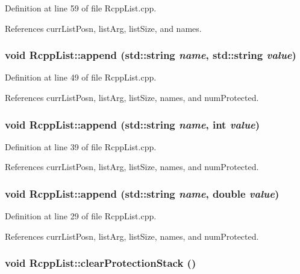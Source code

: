 Definition at line 59 of file RcppList.cpp.

References currListPosn, listArg, listSize, and names.\hypertarget{classRcppList_a896d405a8a82cd6b5b9eaf2976bc54d6}{
\subsubsection[{append}]{\setlength{\rightskip}{0pt plus 5cm}void RcppList::append (std::string {\em name}, \/  std::string {\em value})}}
\label{classRcppList_a896d405a8a82cd6b5b9eaf2976bc54d6}


Definition at line 49 of file RcppList.cpp.

References currListPosn, listArg, listSize, names, and numProtected.\hypertarget{classRcppList_a129144193234d87bcba6aed3acf53254}{
\subsubsection[{append}]{\setlength{\rightskip}{0pt plus 5cm}void RcppList::append (std::string {\em name}, \/  int {\em value})}}
\label{classRcppList_a129144193234d87bcba6aed3acf53254}


Definition at line 39 of file RcppList.cpp.

References currListPosn, listArg, listSize, names, and numProtected.\hypertarget{classRcppList_a259b0c48d68d995bcd906b8c1e8c970a}{
\subsubsection[{append}]{\setlength{\rightskip}{0pt plus 5cm}void RcppList::append (std::string {\em name}, \/  double {\em value})}}
\label{classRcppList_a259b0c48d68d995bcd906b8c1e8c970a}


Definition at line 29 of file RcppList.cpp.

References currListPosn, listArg, listSize, names, and numProtected.\hypertarget{classRcppList_a164577340e23dd0811fc7057aa9aedec}{
\subsubsection[{clearProtectionStack}]{\setlength{\rightskip}{0pt plus 5cm}void RcppList::clearProtectionStack ()}}
\label{classRcppList_a164577340e23dd0811fc7057aa9aedec}


